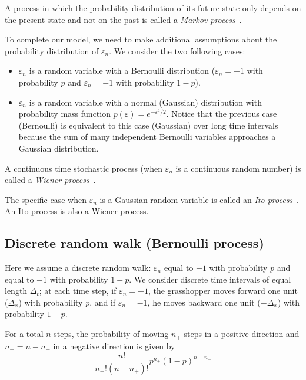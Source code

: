 \documentclass[justified, sixbynine]{tufte-book}
\theoremstyle{plain}%
\newtheorem * {corollary}{Corollary}
\theoremstyle{definition}
\theoremstyle{remark}
\newtheorem * {remark}{Remark}
\newtheorem * {note}{Note}
\begin{document}
\begin{fullwidth}
A process in which the probability distribution of its future state only
depends on the present state and not on the past is called a
{\it Markov process}~\cite{markov}.

To complete our model, we need to make additional assumptions about the
probability distribution of $\varepsilon _n$. We consider the two following cases:

\begin{itemize}
\item  $\varepsilon _n$ is a random variable with a Bernoulli distribution ($%
\varepsilon _n=+1$ with probability $p$ and $\varepsilon _n=-1$ with
probability $1-p$).

\item  $\varepsilon _n$ is a random variable with a normal (Gaussian)
distribution with probability mass function $p(\varepsilon
)=e^{-\varepsilon ^2/2}$. Notice that the previous case (Bernoulli) is equivalent to this case (Gaussian) over long time intervals because the sum of many independent Bernoulli variables approaches a Gaussian distribution.
\end{itemize}

A continuous time stochastic process (when
$\varepsilon _n$ is a continuous random number)
is called a {\it Wiener process}~\cite{wiener}.

The specific case when $\varepsilon _n$ is a Gaussian random variable is called an {\it Ito process}~\cite{ito}. An Ito process is also a Wiener process.

\goodbreak\subsection{Discrete random walk (Bernoulli process)}

Here we assume a discrete  random walk: $\varepsilon _n$ equal to
$+1$ with probability $p$ and equal to $-1$ with probability $1-p.$ We
consider discrete time intervals of equal length $\Delta _t$; at each time
step, if $\varepsilon _n=+1$, the grasshopper moves forward one unit ($\Delta _x$)
with probability $p$, and if $\varepsilon _n=-1$, he moves backward one
unit ($-\Delta _x$) with probability $1-p$.

For a total $n$ steps, the probability of moving $n_{+}$ steps in a positive
direction and $n_{-}=n-n_{+}$ in a negative direction is given by
\begin{equation}
\frac{n!}{n_{+}!(n-n_{+})!}p^{n_{+}}(1-p)^{n-n_{+}}
\end{equation}


\end{fullwidth}
\end{document}
